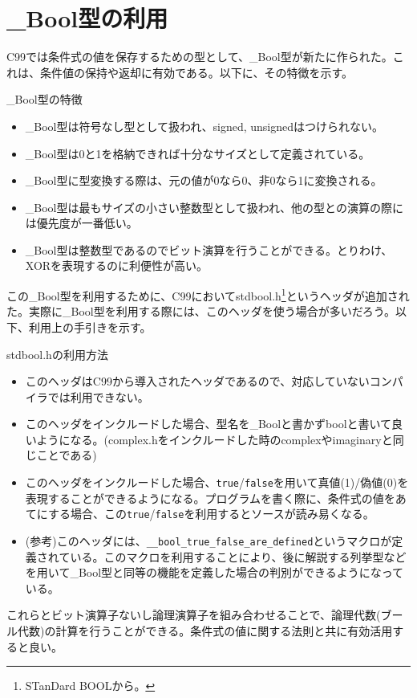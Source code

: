 \section{\_Bool型の利用}
C99では条件式の値を保存するための型として、\_Bool型が新たに作られた。これは、条件値の保持や返却に有効である。以下に、その特徴を示す。
\begin{itembox}[l]{\_Bool型の特徴}
\begin{itemize}
\item \_Bool型は符号なし型として扱われ、signed, unsignedはつけられない。
\item \_Bool型は0と1を格納できれば十分なサイズとして定義されている。
\item \_Bool型に型変換する際は、元の値が0なら0、非0なら1に変換される。
\item \_Bool型は最もサイズの小さい整数型として扱われ、他の型との演算の際には優先度が一番低い。
\item \_Bool型は整数型であるのでビット演算を行うことができる。とりわけ、XORを表現するのに利便性が高い。
\end{itemize}
\end{itembox}
この\_Bool型を利用するために、C99においてstdbool.h\footnote{STanDard BOOLから。}というヘッダが追加された。実際に\_Bool型を利用する際には、このヘッダを使う場合が多いだろう。以下、利用上の手引きを示す。
\begin{itembox}[l]{stdbool.hの利用方法}
\begin{itemize}
\item このヘッダはC99から導入されたヘッダであるので、対応していないコンパイラでは利用できない。
\item このヘッダをインクルードした場合、型名を\_Boolと書かずboolと書いて良いようになる。(complex.hをインクルードした時のcomplexやimaginaryと同じことである)
\item このヘッダをインクルードした場合、\verb|true|/\verb|false|を用いて真値(1)/偽値(0)を表現することができるようになる。プログラムを書く際に、条件式の値をあてにする場合、この\verb|true|/\verb|false|を利用するとソースが読み易くなる。
\item (参考)このヘッダには、\verb|__bool_true_false_are_defined|というマクロが定義されている。このマクロを利用することにより、後に解説する列挙型などを用いて\_Bool型と同等の機能を定義した場合の判別ができるようになっている。
\end{itemize}
\end{itembox}

これらとビット演算子ないし論理演算子を組み合わせることで、論理代数(ブール代数)の計算を行うことができる。条件式の値に関する法則と共に有効活用すると良い。
\newpage

